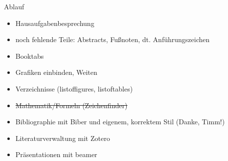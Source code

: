 
\begin{frame}[fragile]{Ablauf}
    
    \begin{itemize}[<+->]
        \item Hausaufgabenbesprechung
        \item noch fehlende Teile: Abstracts, Fußnoten, dt. Anführungszeichen
        \item Booktabs
        \item Grafiken einbinden, Weiten
        \item Verzeichnisse (listoffigures, listoftables)
        \item \st{Mathematik/Formeln (Zeichenfinder)}
        \item Bibliographie mit Biber und eigenem, korrektem Stil (Danke, Timm!)
        \item Literaturverwaltung mit Zotero
        \item Präsentationen mit beamer
    \end{itemize}
    
\end{frame}